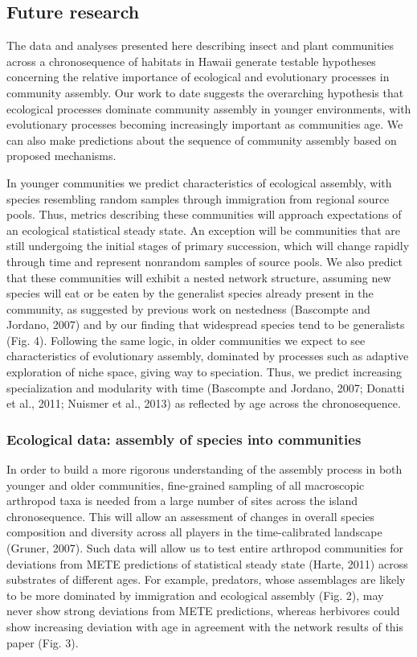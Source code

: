 \subsection{Future research}

The data and analyses presented here describing insect and plant
communities across a chronosequence of habitats in Hawaii generate
testable hypotheses concerning the relative importance of ecological
and evolutionary processes in community assembly. Our work to date
suggests the overarching hypothesis that ecological processes dominate
community assembly in younger environments, with evolutionary
processes becoming increasingly important as communities age. We can
also make predictions about the sequence of community assembly based
on proposed mechanisms.

In younger communities we predict characteristics of ecological
assembly, with species resembling random samples through immigration
from regional source pools. Thus, metrics describing these communities
will approach expectations of an ecological statistical steady
state. An exception will be communities that are still undergoing the
initial stages of primary succession, which will change rapidly
through time and represent nonrandom samples of source pools. We also
predict that these communities will exhibit a nested network
structure, assuming new species will eat or be eaten by the generalist
species already present in the community, as suggested by previous
work on nestedness (Bascompte and Jordano, 2007) and by our finding
that widespread species tend to be generalists (Fig. 4).  Following
the same logic, in older communities we expect to see characteristics
of evolutionary assembly, dominated by processes such as adaptive
exploration of niche space, giving way to speciation. Thus, we predict
increasing specialization and modularity with time (Bascompte and
Jordano, 2007; Donatti et al., 2011; Nuismer et al., 2013) as
reflected by age across the chronosequence.


\subsubsection{Ecological data: assembly of species into communities}

In order to build a more rigorous understanding of the assembly
process in both younger and older communities, fine-grained sampling
of all macroscopic arthropod taxa is needed from a large number of
sites across the island chronosequence. This will allow an assessment
of changes in overall species composition and diversity across all
players in the time-calibrated landscape (Gruner, 2007). Such data
will allow us to test entire arthropod communities for deviations from
METE predictions of statistical steady state (Harte, 2011) across
substrates of different ages. For example, predators, whose
assemblages are likely to be more dominated by immigration and
ecological assembly (Fig. 2), may never show strong deviations from
METE predictions, whereas herbivores could show increasing deviation
with age in agreement with the network results of this paper (Fig. 3).


